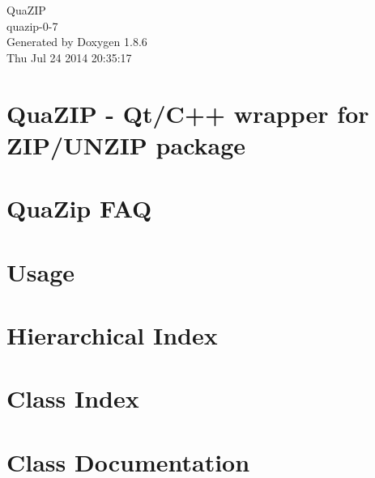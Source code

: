 \documentclass[twoside]{book}
\newcommand{\clearemptydoublepage}{%
  \newpage{\pagestyle{empty}\cleardoublepage}%
}
\begin{document}
\begin{titlepage}
\vspace*{7cm}
\begin{center}%
{\Large Qua\-Z\-I\-P \\[1ex]\large quazip-\/0-\/7 }\\
\vspace*{1cm}
{\large Generated by Doxygen 1.8.6}\\
\vspace*{0.5cm}
{\small Thu Jul 24 2014 20:35:17}\\
\end{center}
\end{titlepage}
\clearemptydoublepage
\tableofcontents
\clearemptydoublepage
{}

\chapter{Qua\-Z\-I\-P -\/ Qt/\-C++ wrapper for Z\-I\-P/\-U\-N\-Z\-I\-P package}
\label{index}
\chapter{Qua\-Zip F\-A\-Q}
\label{faq}

\chapter{Usage}
\label{usage}

\chapter{Hierarchical Index}

\chapter{Class Index}

\chapter{Class Documentation}
















\newpage
{}
{}
\printindex
\end{document}
